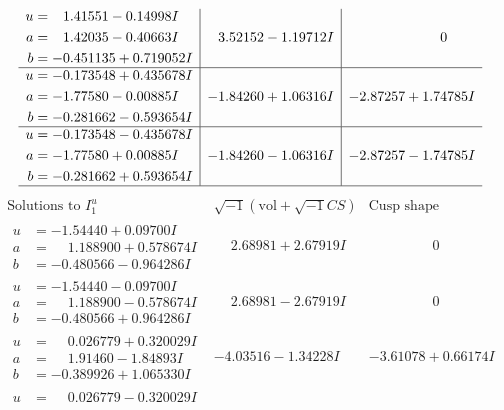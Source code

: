 \documentclass[1p]{elsarticle_modified}
\theoremstyle{definition}
\newcommand{\I}{\sqrt{-1}}
\begin{document}
$$\begin{array}{c|c|c}
\begin{aligned}
u &= \phantom{-}1.41551 - 0.14998 I \\
a &= \phantom{-}1.42035 - 0.40663 I \\
b &= -0.451135 + 0.719052 I\end{aligned}
 & \phantom{-}3.52152 - 1.19712 I & \phantom{-0.000000 } 0 \\ \hline\begin{aligned}
u &= -0.173548 + 0.435678 I \\
a &= -1.77580 - 0.00885 I \\
b &= -0.281662 - 0.593654 I\end{aligned}
 & -1.84260 + 1.06316 I & -2.87257 + 1.74785 I \\ \hline\begin{aligned}
u &= -0.173548 - 0.435678 I \\
a &= -1.77580 + 0.00885 I \\
b &= -0.281662 + 0.593654 I\end{aligned}
 & -1.84260 - 1.06316 I & -2.87257 - 1.74785 I\\
 \hline 
 \end{array}$$\newpage$$\begin{array}{c|c|c}  
\text{Solutions to }I^u_{1}& \I (\text{vol} + \sqrt{-1}CS) & \text{Cusp shape}\\
 \hline 
\begin{aligned}
u &= -1.54440 + 0.09700 I \\
a &= \phantom{-}1.188900 + 0.578674 I \\
b &= -0.480566 - 0.964286 I\end{aligned}
 & \phantom{-}2.68981 + 2.67919 I & \phantom{-0.000000 } 0 \\ \hline\begin{aligned}
u &= -1.54440 - 0.09700 I \\
a &= \phantom{-}1.188900 - 0.578674 I \\
b &= -0.480566 + 0.964286 I\end{aligned}
 & \phantom{-}2.68981 - 2.67919 I & \phantom{-0.000000 } 0 \\ \hline\begin{aligned}
u &= \phantom{-}0.026779 + 0.320029 I \\
a &= \phantom{-}1.91460 - 1.84893 I \\
b &= -0.389926 + 1.065330 I\end{aligned}
 & -4.03516 - 1.34228 I & -3.61078 + 0.66174 I \\ \hline\begin{aligned}
u &= \phantom{-}0.026779 - 0.320029 I \\

\end{aligned}
\end{array}$$
\end{document}
